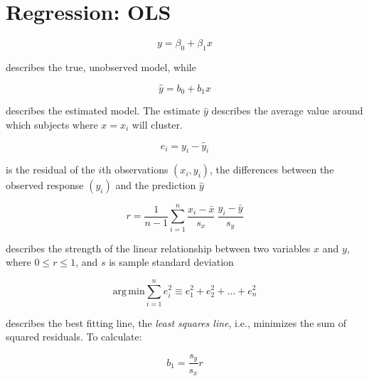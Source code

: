 \section{Regression: OLS}



\begin{equation}
	y = \beta_0 + \beta_1 x
\end{equation}

describes the true, unobserved model, while

\begin{equation}
	\hat{y} = b_0 + b_1x
\end{equation}

describes the estimated model. The estimate $\hat{y}$ describes the average value around which subjects where $x = x_i$ will cluster.
\hformbar




\begin{equation}
	e_i = y_i - \hat{y}_i
\end{equation}

is the residual of the $i$th observations $(x_i, y_i)$, the differences between the observed response $(y_i)$ and the prediction $\hat{y}$

\hformbar




\begin{equation}
	r = \frac{1}{n - 1} \sum_{i=1}^n \frac{x_i - \bar{x}}{s_x} ~ \frac{y_i - \bar{y}}{s_y}
\end{equation}

describes the strength of the linear relationship between two variables $x$ and $y$, where $0 \leq r \leq 1$, and $s$ is sample standard deviation
\hformbar




\begin{equation}
	\mathrm{arg\,min} \sum_{i=1}^n e_i^2  \equiv e_1^2 + e_2^2 + \ldots + e_n^2
\end{equation}

describes the best fitting line, the \textit{least squares line}, i.e., minimizes the sum of squared residuals. To calculate:

\begin{equation}
	b_1 = \frac{s_y}{s_x} r
\end{equation}

